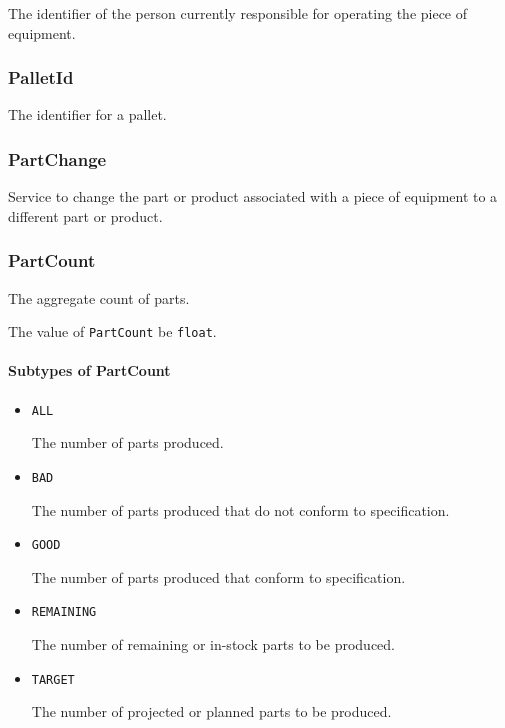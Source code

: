 The identifier of the person currently responsible for operating the piece of equipment.



\subsubsection{PalletId}
\label{sec:PalletId}



The identifier for a pallet.



\subsubsection{PartChange}
\label{sec:PartChange}



Service to change the part or product associated with a piece of equipment to a different part or product.



\subsubsection{PartCount}
\label{sec:PartCount}



The aggregate count of parts.


The value of \texttt{PartCount} \MUST be \texttt{float}.


\paragraph{Subtypes of PartCount}\mbox{}
\label{sec:Subtypes of PartCount}

\begin{itemize}

\item \texttt{ALL}


The number of parts produced. 

\item \texttt{BAD}


The number of parts produced that do not conform to specification.

\item \texttt{GOOD}


The number of parts produced that conform to specification.


\item \texttt{REMAINING}


The number of remaining or in-stock parts to be produced.

\item \texttt{TARGET}


The number of projected or planned parts to be produced.


\end{itemize}








